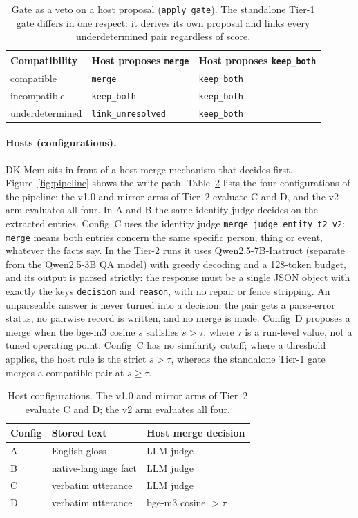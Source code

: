 \begin{table}[t]\centering\small
\begin{tabular}{@{}lll@{}}
\toprule
Compatibility & Host proposes \texttt{merge} & Host proposes \texttt{keep\_both}\\
\midrule
compatible & \texttt{merge} & \texttt{keep\_both}\\
incompatible & \texttt{keep\_both} & \texttt{keep\_both}\\
underdetermined & \texttt{link\_unresolved} & \texttt{keep\_both}\\
\bottomrule
\end{tabular}
\caption{Gate as a veto on a host proposal (\texttt{apply\_gate}). The standalone Tier-1 gate differs in one respect: it derives its own proposal and links every underdetermined pair regardless of score.}
\label{tab:gate}
\end{table}

\paragraph{Hosts (configurations).} DK-Mem sits in front of a host merge mechanism that decides first. Figure~\ref{fig:pipeline} shows the write path. Table~\ref{tab:hosts} lists the four configurations of the
pipeline; the v1.0 and mirror arms of Tier~2 evaluate C and D, and the v2 arm evaluates all four. In A and B the same identity judge
decides on the extracted entries.
Config~C uses the identity judge \texttt{merge\_judge\_entity\_t2\_v2}: \texttt{merge} means both entries concern the same specific person, thing or event, whatever the
facts say. In the Tier-2 runs it uses Qwen2.5-7B-Instruct (separate from the Qwen2.5-3B QA model) with greedy decoding and a 128-token budget, and its output is parsed strictly: the response must be a single JSON object with exactly the keys
\texttt{decision} and \texttt{reason}, with no repair or fence stripping. An unparseable answer is never turned into a decision: the pair gets a parse-error status, no
pairwise record is written, and no merge is made. Config~D proposes a merge when the bge-m3 cosine $s$ satisfies $s>\tau$, where $\tau$ is a run-level value, not a tuned operating point.
Config~C has no similarity cutoff; where a threshold applies, the host rule is the strict $s>\tau$, whereas the standalone Tier-1 gate merges a compatible pair at $s\ge\tau$.

\begin{table}[t]\centering\small
\begin{tabular}{@{}lll@{}}
\toprule
Config & Stored text & Host merge decision\\
\midrule
A & English gloss & LLM judge\\
B & native-language fact & LLM judge\\
C & verbatim utterance & LLM judge\\
D & verbatim utterance & bge-m3 cosine $>\tau$\\
\bottomrule
\end{tabular}
\caption{Host configurations. The v1.0 and mirror arms of Tier~2 evaluate C and D; the v2 arm evaluates all four.}
\label{tab:hosts}
\end{table}

